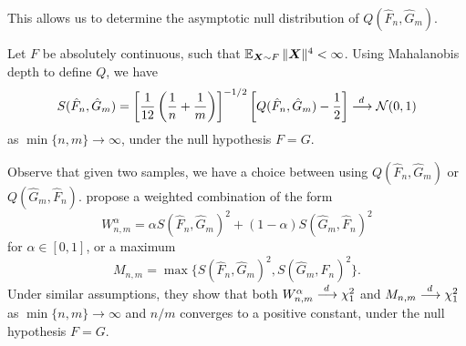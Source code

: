 This allows us to determine the asymptotic null distribution of $Q(\hat{F}_n,
\hat{G}_m)$.

\begin{theorem}
    Let $F$ be absolutely continuous, such that $\operatorname{\mathbb{E}}_{\bm{X} \sim F} \Vert \bm{X} \Vert^4
    < \infty$.
    Using Mahalanobis depth to define $Q$, we have
    \begin{equation}
        S(\hat{F}_n, \hat{G}_m) = \left[\frac{1}{12}\left(\frac{1}{n} + \frac{1}{m}\right)\right]^{-1/2} \left[Q(\hat{F}_n, \hat{G}_m) - \frac{1}{2}\right] \overset{d\,}{\longrightarrow} \mathcal{N}(0, 1)
    \end{equation}
    as $\min\{n, m\} \to \infty$, under the null hypothesis $F = G$.
\end{theorem}

Observe that given two samples, we have a choice between using $Q(\hat{F}_n,
\hat{G}_m)$ or $Q(\hat{G}_m, \hat{F}_n)$.
\textcite{shi-zhang-fu-2023} propose a weighted combination of the form
\begin{equation}
    W^\alpha_{n, m} = \alpha S(\hat{F}_n, \hat{G}_m)^2 + (1 - \alpha) S(\hat{G}_m, \hat{F}_n)^2
\end{equation}
for $\alpha \in [0, 1]$, or a maximum
\begin{equation}
    M_{n, m} = \max\{S(\hat{F}_n, \hat{G}_m)^2, S(\hat{G}_m, \hat{F}_n)^2\}.
\end{equation}
Under similar assumptions, they show that both $W^\alpha_{n, m} \overset{d\,}{\longrightarrow} \chi^2_1$
and $M_{n, m} \overset{d\,}{\longrightarrow} \chi^2_1$ as $\min\{n, m\} \to \infty$ and $n / m$
converges to a positive constant, under the null hypothesis $F = G$.
